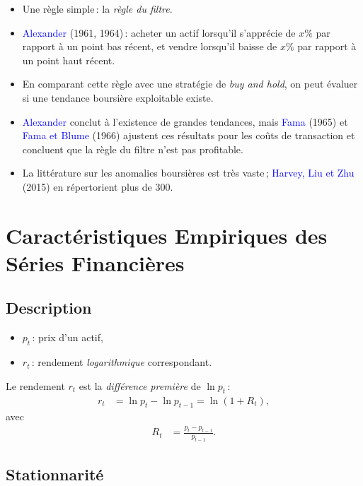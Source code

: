 \documentclass[14pt]{extarticle} %
\newcommand{\livre}[1]{\textcolor{blue}{#1}}
\begin{document}
\begin{itemize}
    \item Une règle simple : la \emph{règle du filtre}.
    \item \livre{Alexander} (1961, 1964) : acheter un actif lorsqu’il s’apprécie de \(x\%\) par rapport à un point bas récent, et vendre lorsqu’il baisse de \(x\%\) par rapport à un point haut récent.
    \item En comparant cette règle avec une stratégie de \emph{buy and hold}, on peut évaluer si une tendance boursière exploitable existe.
    \item \livre{Alexander} conclut à l’existence de grandes tendances, mais \livre{Fama} (1965) et \livre{Fama et Blume} (1966) ajustent ces résultats pour les coûts de transaction et concluent que la règle du filtre n’est pas profitable.
    \item La littérature sur les anomalies boursières est très vaste ; \livre{Harvey, Liu et Zhu} (2015) en répertorient plus de 300.
\end{itemize}

\section{Caractéristiques Empiriques des Séries Financières}

\subsection{Description}

\begin{itemize}
    \item \(p_t\) : prix d’un actif,
    \item \(r_t\) : rendement \emph{logarithmique} correspondant.
\end{itemize}

Le rendement \(r_t\) est la \emph{différence première} de \(\ln p_t\) :
\begin{align*}
    r_t &= \ln p_t - \ln p_{t-1} = \ln(1 + R_t),
\end{align*}
avec
\begin{align*}
    R_t &= \frac{p_t - p_{t-1}}{p_{t-1}}.
\end{align*}

\subsection{Stationnarité}
\end{document}
